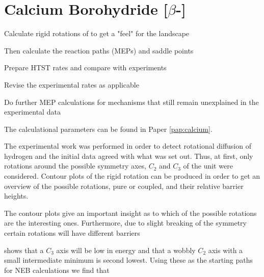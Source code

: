 \section{Calcium Borohydride [$\beta$-]}
\label{sec:borohydrides-calcium}

\bit
\item Calculate rigid rotations of  to get a "feel" for the landscape
\item Then calculate the reaction paths (MEPs) and saddle points
\item Prepare HTST rates and compare with experiments
\item Revise the experimental rates as applicable
\item Do further MEP calculations for mechanisms that still remain unexplained in the experimental data
\eit

The calculational parameters can be found in Paper \ref{pap:calcium}.

The experimental work was performed in order to detect rotational diffusion of hydrogen and the initial data agreed with what was set out.
Thus, at first, only rotations around the possible symmetry axes, $C_2$ and $C_3$ of the  unit were considered.
Contour plots of the rigid rotation can be produced in order to get an overview of the possible rotations, pure or coupled, and their relative barrier heights.

The contour plots give an important insight as to which of the possible rotations are the interesting ones.
Furthermore, due to slight breaking of the symmetry certain rotations will have different barriers \expand

 shows that a $C_3$ axis will be low in energy and that a wobbly $C_2$ axis with a small intermediate minimum is second lowest.
Using these as the starting paths for NEB calculations we find that \expand

\incomplete

